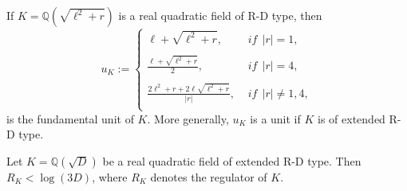 \documentclass[10pt,a4paper]{amsart}
\begin{document}
\begin{lemma}  \label{lemma, Degert}
If $K=\mathbb{Q}(\sqrt{\ell^2+r})$ is a real quadratic field of R-D type, then
	\begin{equation} \label{equation, f.u of R-D type} 
	u_K :=	\left\{
	\begin{array}{ll}
		\ell + \sqrt{\ell^2+r}, \, \, & \textit{if} ~~ |r|= 1,\\
		& \\
		\frac{	\ell + \sqrt{\ell^2+r}}{2}, \, \, & \textit{if} ~~ |r|= 4,\\
		& \\
		\frac{	2\ell^2+r + 2 \ell \sqrt{\ell^2+r}}{|r|}, \, \,  & \textit{if} ~~ |r|\neq 1,4,\\
	\end{array}
	\right.
\end{equation}
is the fundamental unit of $K$. More generally, $u_K$ is a unit if $K$ is of extended R-D type.
\end{lemma}

\begin{lemma}\label{lemma, log R_K less than log dK}
Let $K=\mathbb{Q}(\sqrt{D})$ be a real quadratic field of extended R-D type. Then $ R_K <\log (3 D)$, where $R_K$ denotes the regulator of $K$. 
 \end{lemma}
\end{document}
